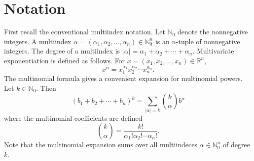 \documentclass{amsart}
\theoremstyle{remark}
\numberwithin{equation}{section}
\newcommand{\RR}{\mathbb{R}}
\newcommand{\NN}{\mathbb{N}}
\begin{document}



\newpage
\section{Notation}

\cite{Stro71}
\cite{Helg65}
\cite{Zalc82}
\cite{Pete82}
\cite{Sval03}
\cite{Cuyt84}
First recall the conventional multiindex notation. Let $\NN_0$ denote the nonnegative integers. A multiindex $\alpha = (\alpha_1, \alpha_2, \ldots, \alpha_n) \in \NN_0^n$ is an $n$-tuple of nonnegative integers. The degree of a multiindex is $|\alpha| = \alpha_1 + \alpha_2 + \cdots + \alpha_n$. Multivariate exponentiation is defined as follows. For $x = (x_1, x_2, \ldots, x_n) \in \RR^n$,
\[
    x^\alpha = x_1^{\alpha_1}x_2^{\alpha_2} \cdots x_n^{\alpha_n}.
\]
The multinomial formula gives a convenient expansion for multinomial powers. Let $k \in \NN_0$. Then
\[
    (b_1 + b_2 + \cdots + b_n)^k = \sum_{|\alpha| = k} \binom{k}{\alpha} b^\alpha
\] 
where the multinomial coefficients are defined
\[
    \binom{k}{\alpha} = \frac{k!}{\alpha_1! \alpha_2! \cdots \alpha_n!}.
\]
Note that the multinomial expansion sums over all multiindeces $\alpha \in \NN_0^n$ of degree $k$.
\end{document}

